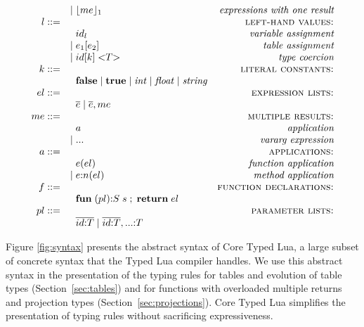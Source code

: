 \documentclass[preprint]{sigplanconf}
\begin{document}
\begin{figure*}[!ht]
$$\begin{array}{rlr}
	& | \; \lfloor me \rfloor_{1} & \textit{expressions with one result}\\
	l ::= & & \textsc{left-hand values:}\\
	& \;\; id_{l} & \textit{variable assignment}\\
	& | \; e_{1}[e_{2}] & \textit{table assignment}\\
	& | \; id[k] \; {<}T{>} & \textit{type coercion}\\
	k ::= & & \textsc{literal constants:}\\
	& \;\; \mathbf{false} \; | \;
	\mathbf{true} \; | \;
	{\it int} \; | \;
	{\it float} \; | \;
	{\it string} & \\
	el ::= & & \textsc{expression lists:}\\
	& \;\; \overline{e} \; | \;
	\overline{e}, me & \\
	me ::= & & \textsc{multiple results:}\\
	& \;\; a & \textit{application}\\
	& | \; {...} & \textit{vararg expression}\\
	a ::= & & \textsc{applications:}\\
	& \;\; e(el) & \textit{function application}\\
	& | \; e{:}n(el) & \textit{method application}\\
	f ::= & & \textsc{function declarations:}\\
	& \;\; \mathbf{fun} \; (pl){:}S \; s \;;\; \mathbf{return} \; el & \\
	pl ::= & & \textsc{parameter lists:}\\
	& \;\; \overline{id{:}T} \; | \;
	\overline{id{:}T},{...}{:}T & \\
	\end{array}
	$$
	\caption{Abstract Syntax}
	\label{fig:syntax}
\end{figure*}

Figure \ref{fig:syntax} presents the abstract syntax of 
Core Typed Lua, a large subset of concrete syntax
that the Typed Lua compiler handles. We use this abstract
syntax in the presentation of the typing rules
for tables and evolution of table types (Section~\ref{sec:tables})
and for functions with overloaded multiple returns and
projection types (Section~\ref{sec:projections}).
Core Typed Lua simplifies the presentation of typing rules
without sacrificing expressiveness.
\end{document}
